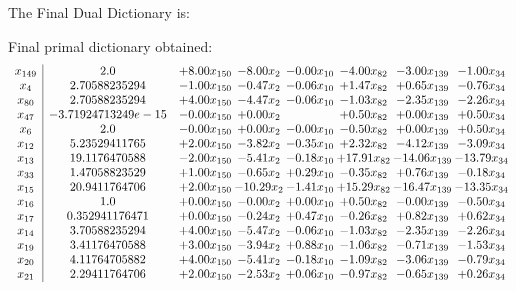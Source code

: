 \documentclass[8pt]{article}
\begin{document}
The Final Dual Dictionary is: 

 Final primal dictionary obtained: 
\[\begin{array}{c| c c@{\hskip 2pt} c@{\hskip 2pt} c@{\hskip 2pt} c@{\hskip 2pt} c@{\hskip 2pt} c@{\hskip 2pt} }
 x_{149}   &  2.0 & +  8.00 x_{150} & -8.00 x_{2} & -0.00 x_{10} & -4.00 x_{82} & -3.00 x_{139} & -1.00 x_{34}\\
 x_{4}   &  2.70588235294 & -1.00 x_{150} & -0.47 x_{2} & -0.06 x_{10} & +  1.47 x_{82} & +  0.65 x_{139} & -0.76 x_{34}\\
 x_{80}   &  2.70588235294 & +  4.00 x_{150} & -4.47 x_{2} & -0.06 x_{10} & -1.03 x_{82} & -2.35 x_{139} & -2.26 x_{34}\\
 x_{47}   &  -3.71924713249e-15 & -0.00 x_{150} & +  0.00 x_{2} &   & +  0.50 x_{82} & +  0.00 x_{139} & +  0.50 x_{34}\\
 x_{6}   &  2.0 & -0.00 x_{150} & +  0.00 x_{2} & -0.00 x_{10} & -0.50 x_{82} & +  0.00 x_{139} & +  0.50 x_{34}\\
 x_{12}   &  5.23529411765 & +  2.00 x_{150} & -3.82 x_{2} & -0.35 x_{10} & +  2.32 x_{82} & -4.12 x_{139} & -3.09 x_{34}\\
 x_{13}   &  19.1176470588 & -2.00 x_{150} & -5.41 x_{2} & -0.18 x_{10} & + 17.91 x_{82} & -14.06 x_{139} & -13.79 x_{34}\\
 x_{33}   &  1.47058823529 & +  1.00 x_{150} & -0.65 x_{2} & +  0.29 x_{10} & -0.35 x_{82} & +  0.76 x_{139} & -0.18 x_{34}\\
 x_{15}   &  20.9411764706 & +  2.00 x_{150} & -10.29 x_{2} & -1.41 x_{10} & + 15.29 x_{82} & -16.47 x_{139} & -13.35 x_{34}\\
 x_{16}   &  1.0 & +  0.00 x_{150} & -0.00 x_{2} & +  0.00 x_{10} & +  0.50 x_{82} & -0.00 x_{139} & -0.50 x_{34}\\
 x_{17}   &  0.352941176471 & +  0.00 x_{150} & -0.24 x_{2} & +  0.47 x_{10} & -0.26 x_{82} & +  0.82 x_{139} & +  0.62 x_{34}\\
 x_{14}   &  3.70588235294 & +  4.00 x_{150} & -5.47 x_{2} & -0.06 x_{10} & -1.03 x_{82} & -2.35 x_{139} & -2.26 x_{34}\\
 x_{19}   &  3.41176470588 & +  3.00 x_{150} & -3.94 x_{2} & +  0.88 x_{10} & -1.06 x_{82} & -0.71 x_{139} & -1.53 x_{34}\\
 x_{20}   &  4.11764705882 & +  4.00 x_{150} & -5.41 x_{2} & -0.18 x_{10} & -1.09 x_{82} & -3.06 x_{139} & -0.79 x_{34}\\
 x_{21}   &  2.29411764706 & +  2.00 x_{150} & -2.53 x_{2} & +  0.06 x_{10} & -0.97 x_{82} & -0.65 x_{139} & +  0.26 x_{34}\\

\end{array}\]
\end{document}
